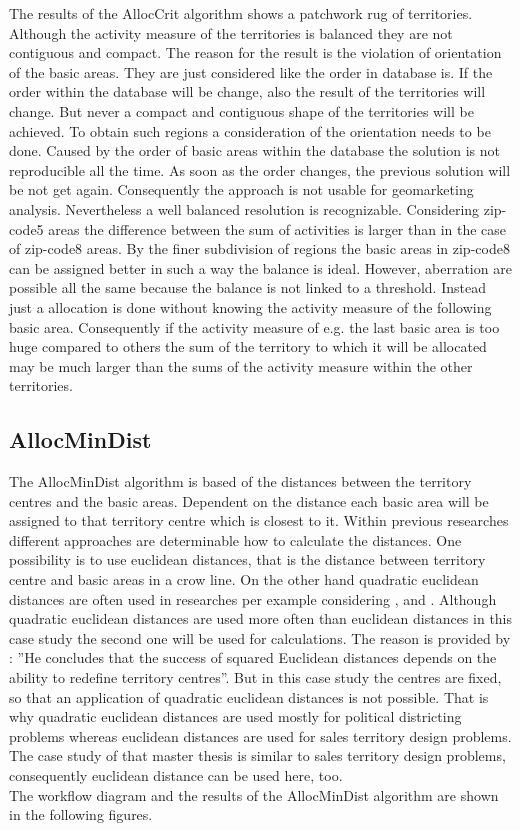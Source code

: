 The results of the AllocCrit algorithm shows a patchwork rug of territories. Although the activity measure of the territories is balanced they are not contiguous and compact. The reason for the result is the violation of orientation of the basic areas. They are just considered like the order in database is. If the order within the database will be change, also the result of the territories will change. But never a compact and contiguous shape of the territories will be achieved. To obtain such regions a consideration of the orientation needs to be done. Caused by the order of basic areas within the database the solution is not reproducible all the time. As soon as the order changes, the previous solution will be not get again. Consequently the approach is not usable for geomarketing analysis. Nevertheless a well balanced resolution is recognizable. Considering zip-code5 areas the difference between the sum of activities is larger than in the case of zip-code8 areas. By the finer subdivision of regions the basic areas in zip-code8 can be assigned better in such a way the balance is ideal. However, aberration are possible all the same because the balance is not linked to a threshold. Instead just a allocation is done without knowing the activity measure of the following basic area. Consequently if the activity measure of e.g. the last basic area is too huge compared to others the sum of the territory to which it will be allocated may be much larger than the sums of the activity measure within the other territories.

\subsection{AllocMinDist}

The AllocMinDist algorithm is based of the distances between the territory centres and the basic areas. Dependent on the distance each basic area will be assigned to that territory centre which is closest to it. Within previous researches different approaches are determinable how to calculate the distances. One possibility is to use euclidean distances, that is the distance between territory centre and basic areas in a crow line. On the other hand quadratic euclidean distances are often used in researches per example considering \citeauthor{fleischmann} \cite{fleischmann},\citeauthor{george} \cite{george} and \citeauthor{hess} \cite{hess}. Although quadratic euclidean distances are used more often than euclidean distances in this case study the second one will be used for calculations. The reason is provided by \citeauthor{marlin}: ''He concludes that the success of squared Euclidean distances depends on the ability to redefine territory centres''\cite{marlin}. But in this case study the centres are fixed, so that an application of quadratic euclidean distances is not possible. That is why quadratic euclidean distances are used mostly for political districting problems whereas euclidean distances are used for sales territory design problems. The case study of that master thesis is similar to sales territory design problems, consequently euclidean distance can be used here, too. \\
The workflow diagram and the results of the AllocMinDist algorithm are shown in the following figures.

